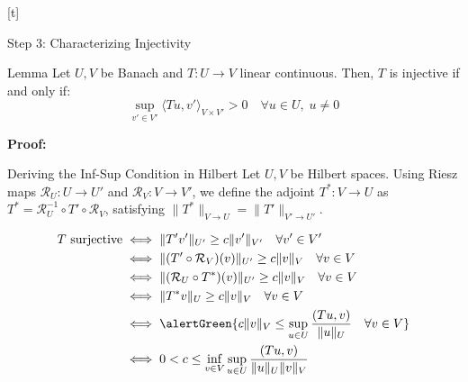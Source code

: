 \documentclass[aspectratio=169]{beamer}
\begin{document}
[t]\begin{frame}[t]{Step 3: Characterizing Injectivity}
    \begin{block}{Lemma}
        Let $U,V$ be Banach and $T: U \to V$  linear continuous. Then, $T$ is injective if and only if:
        $$ \sup_{v' \in V'} \langle Tu, v' \rangle_{V \times V'} > 0 \quad \forall u \in U, \; u \neq 0 $$
    \end{block}

    \vspace{0.2cm}
    \textbf{Proof:} \\

\end{frame}

\begin{frame}{Deriving the Inf-Sup Condition in Hilbert}
    Let $U, V$ be Hilbert spaces. Using Riesz maps $\mathcal{R}_U: U \to U'$ and $\mathcal{R}_V: V \to V'$, we define the adjoint $T^* : V \to U$ as $T^* = \mathcal{R}_U^{-1} \circ T' \circ \mathcal{R}_V$, satisfying $\|T^*\|_{V \to U} = \|T'\|_{V' \to U'}$.

    \vspace{0.2cm}
    \begin{align*}
        T \text{ surjective} &\iff \|T' v'\|_{U'} \ge c \|v'\|_{V'} \quad \forall v' \in V'  \\
        &\iff \|(T' \circ \mathcal{R}_V)(v)\|_{U'} \ge c \|v\|_V \quad \forall v \in V  \\
        &\iff \|(\mathcal{R}_U \circ T^*)(v)\|_{U'} \ge c \|v\|_V \quad \forall v \in V  \\
        &\iff \|T^* v\|_U \ge c \|v\|_V \quad \forall v \in V  \\
        &\iff \alertGreen{c \|v\|_V \le \sup_{u \in U} \frac{(Tu, v)}{\|u\|_U} \quad \forall v \in V}  \\
        &\iff 0 < c \le \inf_{v \in V} \sup_{u \in U} \frac{(Tu, v)}{\|u\|_U \|v\|_V}
    \end{align*}
\end{frame}
\end{document}
